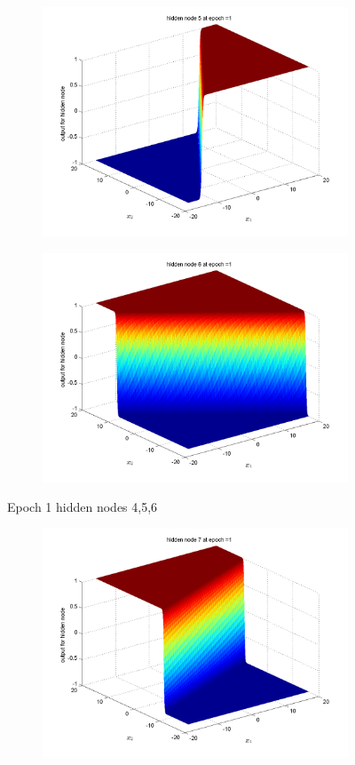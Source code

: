\documentclass{article}
\begin{document}
\begin{flushleft}
\begin{figure}
\begin{subfigure}{.3\textwidth}
\end{subfigure}%
\begin{subfigure}{.3\textwidth}
  \centering
  \includegraphics[width=.8\linewidth]{Classification/linearlySeparable/h1_5}
  
\end{subfigure}
\begin{subfigure}{.3\textwidth}
  \centering
  \includegraphics[width=.8\linewidth]{Classification/linearlySeparable/h1_6}
  
\end{subfigure}
\caption{Epoch 1 hidden nodes 4,5,6}
\end{figure}

\begin{figure}
\begin{subfigure}{.3\textwidth}
  \centering
  \includegraphics[width=.8\linewidth]{Classification/linearlySeparable/h1_7}
 

\end{subfigure}
\end{figure}
\end{flushleft}
\end{document}
